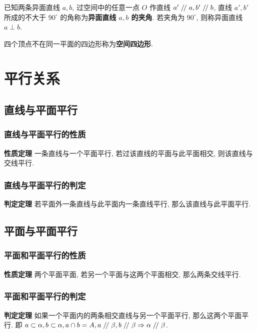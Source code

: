 \documentclass[titlepage]{ctexart}
\renewcommand\parallel{\mathrel{/\mskip-2.5mu/}}
\begin{document}
已知两条异面直线 $a, b$, 过空间中的任意一点 $O$ 作直线 $a' \parallel a, b' \parallel b$,
直线 $a', b'$ 所成的不大于 $90^\circ$ 的角称为\textbf{异面直线 $a, b$ 的夹角}.
若夹角为 $90^\circ$, 则称异面直线 $a \perp b$.

四个顶点不在同一平面的四边形称为\textbf{空间四边形}.


\section{平行关系}

\subsection{直线与平面平行}

\subsubsection{直线与平面平行的性质}

\textbf{性质定理} \quad 一条直线与一个平面平行, 若过该直线的平面与此平面相交, 则该直线与交线平行.

\subsubsection{直线与平面平行的判定}

\textbf{判定定理} \quad 若平面外一条直线与此平面内一条直线平行, 那么该直线与此平面平行.

\subsection{平面与平面平行}

\subsubsection{平面和平面平行的性质}

\textbf{性质定理} \quad 两个平面平面, 若另一个平面与这两个平面相交, 那么两条交线平行.

\subsubsection{平面和平面平行的判定}

\textbf{判定定理} \quad 如果一个平面内的两条相交直线与另一个平面平行, 那么这两个平面平行.
即 $a \subset \alpha, b \subset \alpha, a \cap b = A, a \parallel \beta, b \parallel \beta \Rightarrow \alpha \parallel \beta$.
\end{document}
